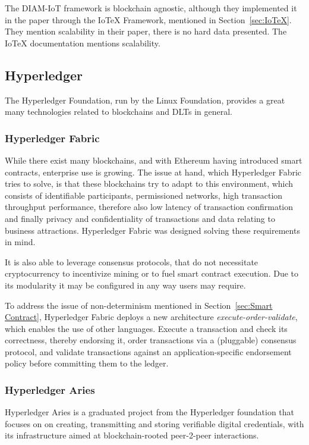 The DIAM-IoT framework is blockchain agnostic, although they implemented it in the paper through the IoTeX Framework,
mentioned in Section~\ref{sec:IoTeX}. They mention scalability in their paper, there is no hard data presented.
The IoTeX documentation mentions scalability.

\subsection{Hyperledger} %
\label{sub:Hyperledger}

The Hyperledger Foundation, run by the Linux Foundation, provides a great many technologies related to blockchains and
DLTs in general.

\subsubsection{Hyperledger Fabric} %
\label{sec:Hyperledger Fabric}
While there exist many blockchains, and with Ethereum having introduced smart contracts, enterprise use is growing. The
issue at hand, which Hyperledger Fabric tries to solve, is that these blockchains try to adapt to this environment,
which consists of identifiable participants, permissioned networks, high transaction throughput performance, therefore
also low latency of transaction confirmation and finally privacy and confidentiality of transactions and data relating
to business attractions. Hyperledger Fabric was designed solving these requirements in mind. \cite{hyperledger:fabric:docs}

It is also able to leverage consensus protocols, that do not necessitate cryptocurrency to incentivize mining or to
fuel smart contract execution. Due to its modularity it may be configured in any way users may require.

To address the issue of non-determinism mentioned in Section~\ref{sec:Smart Contract}, Hyperledger Fabric deploys a new
architecture \textit{execute-order-validate}, which enables the use of other languages. Execute a transaction and check
its correctness, thereby endorsing it, order transactions via a (pluggable) consensus protocol, and validate
transactions against an application-specific endorsement policy before committing them to the ledger. \cite{hyperledger:fabric:docs}

\subsubsection{Hyperledger Aries} %
\label{sec:Hyperledger Aries}
Hyperledger Aries is a graduated project from the Hyperledger foundation that focuses on on creating, transmitting and
storing verifiable digital credentials, with its infrastructure aimed at blockchain-rooted peer-2-peer interactions.

